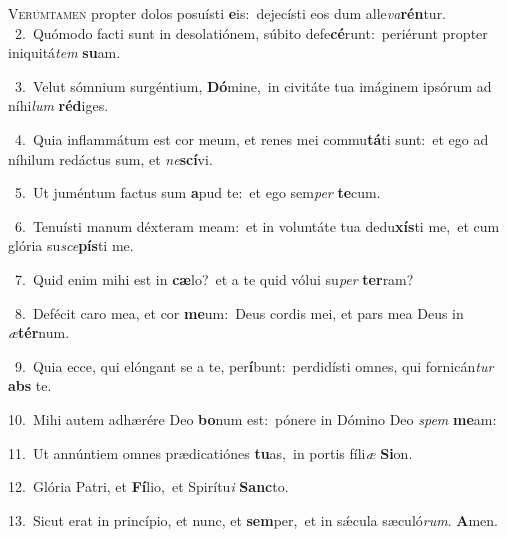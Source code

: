 \lettrine{\initial\textcolor{\initialcolor}{V}}{erúmtamen} propter dolos posuísti \textbf{e}\-is:~\star dejecísti eos dum alle\-\textit{va}\-\textbf{rén}tur.\\
{\numbfont\textcolor{\numbcolor}{~2.}}~Quómodo facti sunt in desolatiónem, súbito defe\-\textbf{cé}\-runt:~\star periérunt propter iniquitá\textit{tem} \textbf{su}\-am.\par
{\numbfont\textcolor{\numbcolor}{~3.}}~Velut sómnium surgéntium, \textbf{Dó}\-mine,~\star in civitáte tua imáginem ipsórum ad níhi\textit{lum} \textbf{réd}\-iges.\par
{\numbfont\textcolor{\numbcolor}{~4.}}~Quia inflammátum est cor meum, et renes mei commu\-\textbf{tá}\-ti sunt:~\star et ego ad níhilum redáctus sum, et \textit{ne}\-\textbf{scí}vi.\par
{\numbfont\textcolor{\numbcolor}{~5.}}~Ut juméntum factus sum \textbf{a}\-pud te:~\star et ego sem\textit{per} \textbf{te}\-cum.\par
{\numbfont\textcolor{\numbcolor}{~6.}}~Tenuísti manum déxteram meam:~\dagger et in voluntáte tua dedu\-\textbf{xís}\-ti me,~\star et cum glória su\-\textit{sce}\-\textbf{pís}ti me.\par
{\numbfont\textcolor{\numbcolor}{~7.}}~Quid enim mihi est in \textbf{cæ}\-lo?~\star et a te quid vólui su\textit{per} \textbf{ter}\-ram?\par
{\numbfont\textcolor{\numbcolor}{~8.}}~Defécit caro mea, et cor \textbf{me}\-um:~\star Deus cordis mei, et pars mea Deus in \textit{æ}\-\textbf{tér}num.\par
{\numbfont\textcolor{\numbcolor}{~9.}}~Quia ecce, qui elóngant se a te, per\-\textbf{í}\-bunt:~\star perdidísti omnes, qui fornicán\textit{tur} \textbf{abs} te.\par
{\numbfont\textcolor{\numbcolor}{10.}}~Mihi autem adhærére Deo \textbf{bo}\-num est:~\star pónere in Dómino Deo \textit{spem} \textbf{me}\-am:\par
{\numbfont\textcolor{\numbcolor}{11.}}~Ut annúntiem omnes prædicatiónes \textbf{tu}\-as,~\star in portis fíli\textit{æ} \textbf{Si}\-on.\par
{\numbfont\textcolor{\numbcolor}{12.}}~Glória Patri, et \textbf{Fí}\-lio,~\star et Spirítu\textit{i} \textbf{Sanc}\-to.\par
{\numbfont\textcolor{\numbcolor}{13.}}~Sicut erat in princípio, et nunc, et \textbf{sem}\-per,~\star et in sǽcula sæculó\-\textit{rum}\-. \textbf{A}\-men.\par
